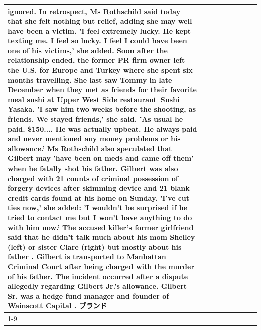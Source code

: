 \begin{table}[H]
\begin{tabular}{lllrlllll}
ignored. In retrospect, Ms Rothschild said today that she felt nothing but relief, adding she may well have been a victim. 'I feel extremely lucky. He kept texting me. I feel so lucky. I feel I could have been one of his victims,' she added. Soon after the relationship ended, the former PR firm owner left the U.S. for Europe and Turkey where she spent six months  travelling. She last saw Tommy in late December when they met as friends for their favorite meal sushi at Upper West Side restaurant Sushi Yasaka. 'I saw him two weeks before the shooting, as friends. We stayed friends,' she said. 'As usual he paid. \$150.... He was actually upbeat. He always paid and never mentioned any money problems or his allowance.' Ms Rothschild also speculated that Gilbert may 'have been on meds and came off them' when he fatally shot his father. Gilbert was also charged with 21 counts of criminal possession of forgery devices after skimming device and 21 blank credit cards found at his home on Sunday. 'I've cut ties now,' she added: 'I wouldn’t be surprised if he tried to contact me but I won’t have anything to do with him now.' The accused killer's former girlfriend said that he didn't talk much about his mom Shelley (left) or sister Clare (right) but mostly about his father . Gilbert is transported to Manhattan Criminal Court  after being charged with the murder of his father. The incident occurred after a dispute allegedly regarding Gilbert Jr.'s allowance. Gilbert Sr. was a hedge fund manager and founder of Wainscott Capital . ブランド \\
\cline{1-9} \cline{2-9}

\end{tabular}
\end{table}
